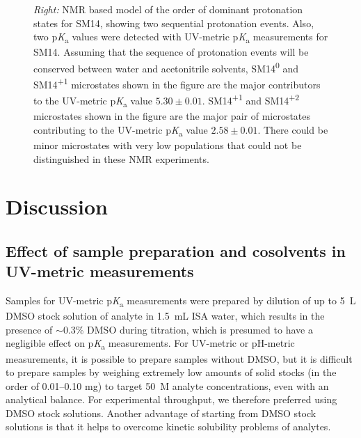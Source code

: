 \documentclass[9pt,lineno]{elife}
\newcommand{\pKa}{p\textit{K}\textsubscript{a}}
\begin{document}
\begin{figure}
\begin{center}
{\textit{Right:} NMR based model of the order of dominant protonation states for SM14, showing two sequential protonation events. 
Also, two \pKa{} values were detected with UV-metric \pKa{} measurements for SM14. 
Assuming that the sequence of protonation events will be conserved between water and acetonitrile solvents, SM14\textsuperscript{0} and SM14\textsuperscript{+1} microstates shown in the figure are the major contributors to the UV-metric \pKa{} value $5.30 \pm 0.01$. 
SM14\textsuperscript{+1} and SM14\textsuperscript{+2} microstates shown in the figure are the major pair of microstates contributing to the UV-metric \pKa{} value $2.58 \pm 0.01$. 
There could be minor microstates with very low populations that could not be distinguished in these NMR experiments.
}
\label{fig:NMR_microstates}
\end{center}
\end{figure}


\section{Discussion}

\subsection{Effect of sample preparation and cosolvents in UV-metric measurements}

Samples for UV-metric \pKa{} measurements were prepared by dilution of up to 5~{\micro}L DMSO stock solution of analyte in 1.5~mL ISA water, which results in the presence of $\sim$0.3\% DMSO during titration, which is presumed to have a negligible effect on \pKa{} measurements. 
For UV-metric or pH-metric measurements, it is possible to prepare samples without DMSO, but it is difficult to prepare samples by weighing extremely low amounts of solid stocks (in the order of 0.01--0.10 mg) to target 50~{\micro}M analyte concentrations, even with an analytical balance. 
For experimental throughput, we therefore preferred using DMSO stock solutions. 
Another advantage of starting from DMSO stock solutions is that it helps to overcome kinetic solubility problems of analytes.
\end{document}
